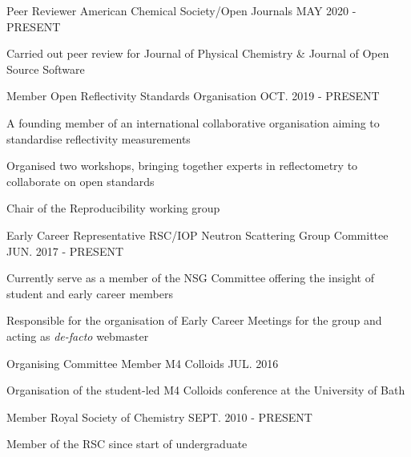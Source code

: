 \begin{cventries}
  \cventry
    {Peer Reviewer}
    {American Chemical Society/Open Journals}
    {}
    {MAY 2020 - PRESENT}
    {
        \begin{cvitems}
            \item{Carried out peer review for Journal of Physical Chemistry \& Journal of Open Source Software}
        \end{cvitems}
    }
  \cventry
    {Member}
    {Open Reflectivity Standards Organisation}
    {}
    {OCT. 2019 - PRESENT}
    {
      \begin {cvitems}
        \item {A founding member of an international collaborative organisation aiming to standardise reflectivity measurements}
        \item {Organised two workshops, bringing together experts in reflectometry to collaborate on open standards}
        \item {Chair of the Reproducibility working group}
      \end {cvitems}
    }
  \cventry
  	{Early Career Representative}
    {RSC/IOP Neutron Scattering Group Committee}
    {}
    {JUN. 2017 - PRESENT}
    {
      \begin{cvitems}
      	\item{Currently serve as a member of the NSG Committee offering the insight of student and early career members}
      	\item{Responsible for the organisation of Early Career Meetings for the group and acting as \emph{de-facto} webmaster}
	  \end{cvitems}
	}
  \cventry
    {Organising Committee Member}
    {M4 Colloids}
    {}
    {JUL. 2016}
    {
      \begin{cvitems}
        \item{Organisation of the student-led M4 Colloids conference at the University of Bath}
      \end{cvitems}
    }
  \cventry
    {Member}
    {Royal Society of Chemistry}
    {}
    {SEPT. 2010 - PRESENT}
    {
      \begin{cvitems}
      	\item{Member of the RSC since start of undergraduate}
      \end{cvitems}
    }
\end{cventries}
